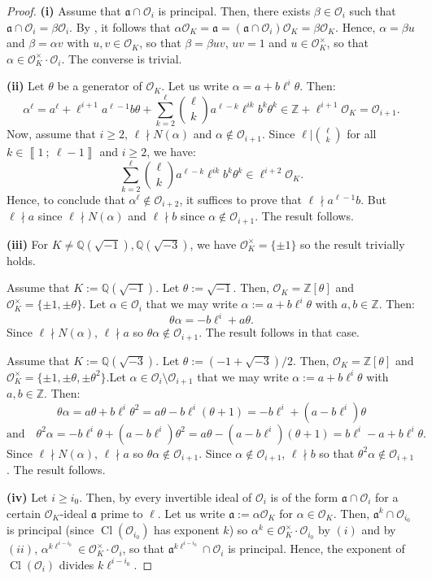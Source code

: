 \documentclass[a4paper,10pt]{report}
\theoremstyle{definition}
\theoremstyle{plain}
\theoremstyle{definition}
\newcommand{\Z}{\mathbb{Z}}
\newcommand{\Q}{\mathbb{Q}}
\newcommand{\mO}{\mathcal{O}}
\renewcommand{\i}[2]{\left\llbracket #1~;~#2\right\rrbracket}
\renewcommand{\(}{\left(}
\renewcommand{\)}{\right)}
\newcommand{\mf}[1]{\mathfrak{#1}}
\DeclareMathOperator{\Cl}{Cl}
\begin{document}
\begin{proof}

\textbf{(i)} Assume that $\mf{a}\cap\mO_i$ is principal. Then, there exists $\beta\in\mO_i$ such that $\mf{a}\cap\mO_i=\beta\mO_i$.  By \cite[Proposition 7.20]{Cox}, it follows that $\alpha\mO_K=\mf{a}=(\mf{a}\cap\mO_i)\mO_K=\beta\mO_K$. Hence, $\alpha=\beta u$ and $\beta=\alpha v$ with $u, v\in\mO_K$, so that $\beta=\beta uv$, $uv=1$ and $u\in\mO_K^\times$, so that $\alpha\in\mO_K^\times\cdot \mO_i$. The converse is trivial.

\textbf{(ii)} Let $\theta$ be a generator of $\mO_K$. Let us write $\alpha=a+b\ell^i\theta$.  Then:
\[\alpha^\ell=a^\ell+\ell^{i+1}a^{\ell-1}b\theta+\sum_{k=2}^\ell\binom{\ell}{k}a^{\ell-k}\ell^{ik}b^k\theta^k\in \Z+\ell^{i+1}\mO_K=\mO_{i+1}.\]
Now, assume that $i\geq 2$, $\ell\nmid N(\alpha)$ and $\alpha\not\in\mO_{i+1}$. Since $\ell|\binom{\ell}{k}$ for all $k\in\i{1}{\ell-1}$ and $i\geq 2$, we have:
\[\sum_{k=2}^\ell\binom{\ell}{k}a^{\ell-k}\ell^{ik}b^k\theta^k\in\ell^{i+2}\mO_K.\]
Hence, to conclude that $\alpha^\ell\not\in\mO_{i+2}$, it suffices to prove that $\ell\nmid a^{\ell-1}b$. But $\ell\nmid a$ since $\ell\nmid N(\alpha)$ and $\ell\nmid b$ since $\alpha\not\in\mO_{i+1}$. The result follows.

\textbf{(iii)} For $K\neq \Q(\sqrt{-1}), \Q(\sqrt{-3})$, we have $\mO_K^\times=\{\pm 1\}$ so the result trivially holds.

Assume that $K:=\Q(\sqrt{-1})$. Let $\theta:=\sqrt{-1}$. Then, $\mO_K=\Z[\theta]$ and $\mO_K^\times=\{\pm 1,\pm\theta\}$.  Let $\alpha\in\mO_{i}$ that we may write $\alpha:=a+b\ell^{i}\theta$ with $a,b\in\Z$. Then:
\[\theta\alpha=-b\ell^{i}+a\theta.\]
Since $\ell\nmid N(\alpha)$, $\ell\nmid a$ so $\theta\alpha\not\in\mO_{i+1}$.  The result follows in that case.

Assume that $K:=\Q(\sqrt{-3})$. Let $\theta:=(-1+\sqrt{-3})/2$. Then, $\mO_K=\Z[\theta]$ and $\mO_K^\times=\{\pm 1,\pm\theta,\pm\theta^2\}$.Let $\alpha\in\mO_{i}\setminus\mO_{i+1}$ that we may write $\alpha:=a+b\ell^{i}\theta$ with $a,b\in\Z$. Then:
\[\theta\alpha=a\theta+b\ell^i\theta^2=a\theta-b\ell^i(\theta+1)=-b\ell^i+(a-b\ell^i)\theta\]
\[\mbox{and} \quad \theta^2\alpha=-b\ell^i\theta+(a-b\ell^i)\theta^2=a\theta-(a-b\ell^i)(\theta+1)=b\ell^i-a+b\ell^i\theta.\]
Since $\ell\nmid N(\alpha)$, $\ell\nmid a$ so $\theta\alpha\not\in\mO_{i+1}$.  Since $\alpha\not\in\mO_{i+1}$, $\ell\nmid b$ so that $\theta^2\alpha\not\in\mO_{i+1}$. The result follows.

\textbf{(iv)} Let $i\geq i_0$. Then, by \cite[Proposition 7.20]{Cox} every invertible ideal of $\mO_i$ is of the form  $\mf{a}\cap\mO_i$ for a certain $\mO_K$-ideal $\mf{a}$ prime to $\ell$.  Let us write $\mf{a}:=\alpha\mO_K$ for $\alpha\in\mO_K$. Then, $\mf{a}^k\cap\mO_{i_0}$ is principal (since $\Cl(\mO_{i_0})$ has exponent $k$) so $\alpha^{k}\in\mO_K^\times\cdot \mO_{i_0}$ by $(i)$ and by $(ii)$, $\alpha^{k\ell^{i-i_0}}\in\mO_K^\times\cdot\mO_i$, so that $\mf{a}^{k\ell^{i-i_0}}\cap\mO_i$ is principal. Hence, the exponent of $\Cl(\mO_i)$ divides $k\ell^{i-i_0}$. 


\end{proof}
\end{document}
